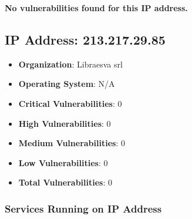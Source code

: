 \documentclass{article}
\begin{document}
\textbf{No vulnerabilities found for this IP address.}




\clearpage



\subsection{IP Address: 213.217.29.85}

\begin{itemize}
    \item \textbf{Organization}: Libraesva srl
    \item \textbf{Operating System}:  N/A 
    \item \textbf{Critical Vulnerabilities}: 0
    \item \textbf{High Vulnerabilities}: 0
    \item \textbf{Medium Vulnerabilities}: 0
    \item \textbf{Low Vulnerabilities}: 0
    \item \textbf{Total Vulnerabilities}: 0
\end{itemize}

\subsubsection*{Services Running on IP Address}
\end{document}

